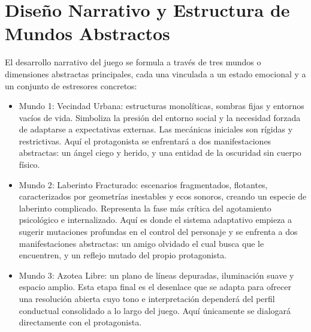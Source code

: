 \section{Diseño Narrativo y Estructura de Mundos Abstractos}
El desarrollo narrativo del juego se formula a través de tres mundos o dimensiones abstractas principales, cada una vinculada a un estado emocional y a un conjunto de estresores concretos:
\begin{itemize}
  \item Mundo 1: Vecindad Urbana: estructuras monolíticas, sombras fijas y entornos vacíos de vida. Simboliza la presión del entorno social y la necesidad forzada de adaptarse a expectativas externas. Las mecánicas iniciales son rígidas y restrictivas. Aquí el protagonista se enfrentará a dos manifestaciones abstractas: un ángel ciego y herido, y una entidad de la oscuridad sin cuerpo físico.
  \item Mundo 2: Laberinto Fracturado: escenarios fragmentados, flotantes, caracterizados por geometrías inestables y ecos sonoros, creando un especie de laberinto complicado. Representa la fase más crítica del agotamiento psicológico e internalizado. Aquí es donde el sistema adaptativo empieza a sugerir mutaciones profundas en el control del personaje y se enfrenta a dos manifestaciones abstractas: un amigo olvidado el cual busca que le encuentren, y un reflejo mutado del propio protagonista.
  \item Mundo 3: Azotea Libre: un plano de líneas depuradas, iluminación suave y espacio amplio. Esta etapa final es el desenlace que se adapta para ofrecer una resolución abierta cuyo tono e interpretación dependerá del perfil conductual consolidado a lo largo del juego. Aquí únicamente se dialogará directamente con el protagonista.
\end{itemize}

